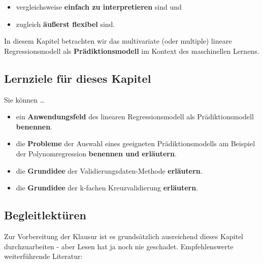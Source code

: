 \documentclass[
  ngerman,
]{book}
\providecommand{\tightlist}{%
  \setlength{\itemsep}{0pt}\setlength{\parskip}{0pt}}
\begin{document}
\begin{itemize}
\tightlist
\item
  vergleichsweise \textbf{einfach zu interpretieren} sind und
\item
  zugleich \textbf{äußerst flexibel} sind.
\end{itemize}

In diesem Kapitel betrachten wir das multivariate (oder multiple) lineare Regressionsmodell als \textbf{Prädiktionsmodell} im Kontext des maschinellen Lernens.

\hypertarget{lernziele-fuxfcr-dieses-kapitel-1}{%
\subsection*{Lernziele für dieses Kapitel}\label{lernziele-fuxfcr-dieses-kapitel-1}}

Sie können \ldots{}

\begin{itemize}
\tightlist
\item
  ein \textbf{Anwendungsfeld} des linearen Regressionsmodell als Prädiktionsmodell \textbf{benennen}.
\item
  die \textbf{Probleme} der Auswahl eines geeigneten Prädiktionsmodells am Beispiel der Polynomregression \textbf{benennen und erläutern}.
\item
  die \textbf{Grundidee} der Validierungsdaten-Methode \textbf{erläutern}.
\item
  die \textbf{Grundidee} der k-fachen Kreuzvalidierung \textbf{erläutern}.
\end{itemize}

\hypertarget{begleitlektuxfcren-1}{%
\subsection*{Begleitlektüren}\label{begleitlektuxfcren-1}}

Zur Vorbereitung der Klausur ist es grundsätzlich ausreichend dieses Kapitel durchzuarbeiten - aber Lesen hat ja noch nie geschadet. Empfehlenswerte weiterführende Literatur:
\end{document}
